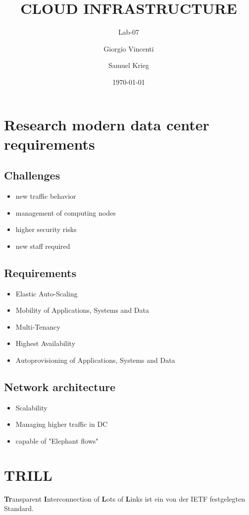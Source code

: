 \documentclass[a4,12pt]{scrartcl}
\title{CLOUD INFRASTRUCTURE}
\subtitle{Lab-07}
\author{Giorgio Vincenti \and Samuel Krieg}
\date{\today}
\begin{document}
\clearpage\maketitle
\thispagestyle{empty}
\tableofcontents
\newpage

\section{Research modern data center requirements}
\subsection{Challenges}
\begin{itemize}
\item new traffic behavior
\item management of computing nodes
\item higher security risks
\item new staff required
\end{itemize}

\subsection{Requirements}
\begin{itemize}
\item Elastic Auto-Scaling
\item Mobility of Applications, Systems and Data
\item Multi-Tenancy
\item Highest Availability
\item Autoprovisioning of Applications, Systems and Data
\end{itemize}

\subsection{Network architecture}
\begin{itemize}
\item Scalability
\item Managing higher traffic in DC
\item capable of "Elephant flows"
\end{itemize}

\section{TRILL}
\textbf{Tr}ansparent \textbf{I}nterconnection of \textbf{L}ots of \textbf{L}inks ist ein von der IETF festgelegten Standard.
\end{document}
